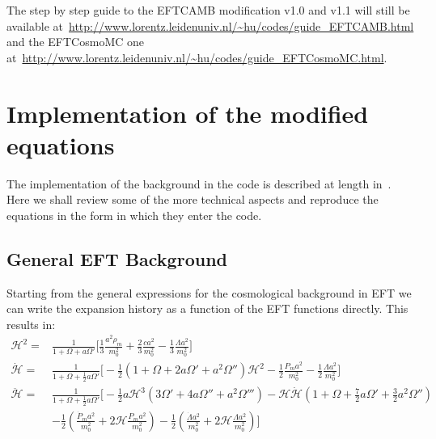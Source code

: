 \documentclass[prd,nofootinbib,showpacs]{revtex4}
\def\hub{{\mathcal H}}
\begin{document}
{The step by step guide to the EFTCAMB modification v1.0 and v1.1 will still be available at~\url{http://www.lorentz.leidenuniv.nl/~hu/codes/guide_EFTCAMB.html} and the  EFTCosmoMC one at~\url{http://www.lorentz.leidenuniv.nl/~hu/codes/guide_EFTCosmoMC.html}.

\section{Implementation of the modified equations}\label{Sec:ModEquations}
The implementation of the background in the code is described at length in~\cite{Hu:2013twa}. Here we shall review some of the more technical aspects and reproduce the equations in the form in which they enter the code. 

\subsection{General EFT Background} \label{SubSec:FullEFTBackground}
%
Starting from the general expressions for the cosmological background in EFT we can write the expansion history as a function of the EFT functions directly.
This results in:
%
\begin{align}
\hub^2 =& \frac{1}{1+\Omega +a\Omega'} \bigg[ \frac{1}{3} \frac{a^2\rho_m}{m_0^2} +\frac{2}{3}\frac{ca^2}{m_0^2}  -\frac{1}{3} \frac{\Lambda a^2}{m_0^2}\bigg] \nonumber \\
\dot{\hub} =& \frac{1}{1+\Omega+\frac{1}{2}a\Omega'} \bigg[ -\frac{1}{2}\left( 1+\Omega+2a\Omega' +a^2\Omega'' \right)\hub^2 -\frac{1}{2}\frac{P_ma^2}{m_0^2} -\frac{1}{2}\frac{\Lambda a^2}{m_0^2} \bigg] \nonumber \\
\ddot{\hub} =& \frac{1}{1+\Omega +\frac{1}{2}a\Omega' } \bigg[ -\frac{1}{2}a\hub^3\left( 3\Omega' +4a\Omega'' +a^2\Omega'''\right) -\hub\dot{\hub}\left( 1+\Omega +\frac{7}{2}a\Omega' +\frac{3}{2}a^2\Omega'' \right) \nonumber \\
&-\frac{1}{2}\left( \frac{\dot{P}_ma^2}{m_0^2} +2\hub \frac{P_ma^2}{m_0^2}\right) -\frac{1}{2}\left( \frac{\dot{\Lambda}a^2}{m_0^2} +2\hub \frac{\Lambda a^2}{m_0^2}\right) \bigg]
\end{align}
%

}
\end{document}
